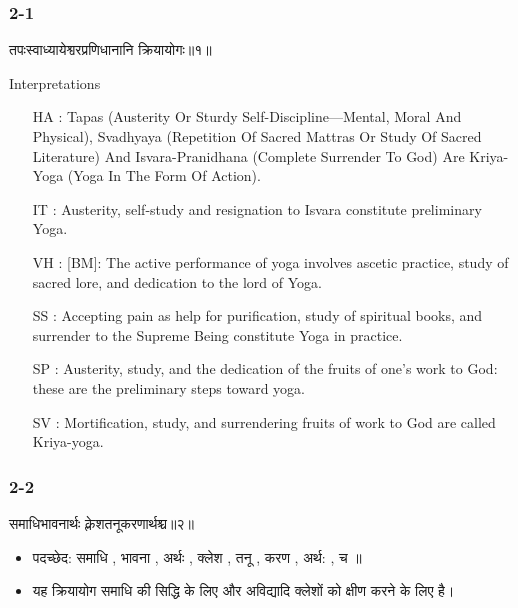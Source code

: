 \begin{frame}[fragile]\frametitle{2-1}
\begin{sanskrit}
तपःस्वाध्यायेश्वरप्रणिधानानि क्रियायोगः॥१॥
\end{sanskrit}

Interpretations
\begin{itemize}
\item [HA]: Tapas (Austerity Or Sturdy Self-Discipline—Mental, Moral And Physical), Svadhyaya (Repetition Of Sacred Mattras Or Study Of Sacred Literature) And Isvara-Pranidhana (Complete Surrender To God) Are Kriya-Yoga (Yoga In The Form Of Action).
\item [IT]: Austerity, self-study and resignation to Isvara constitute preliminary Yoga.
\item [VH]: [BM]: The active performance of yoga involves ascetic practice, study of sacred lore, and dedication to the lord of Yoga.
\item [SS]: Accepting pain as help for purification, study of spiritual books, and surrender to the Supreme Being constitute Yoga in practice.
\item [SP]: Austerity, study, and the dedication of the fruits of one’s work to God: these are the preliminary steps toward yoga.
\item [SV]: Mortification, study, and surrendering fruits of work to God are called Kriya-yoga. 
\end{itemize}
	
\end{frame}

\begin{frame}[fragile]\frametitle{2-2}
\begin{sanskrit}
समाधिभावनार्थः क्लेशतनूकरणार्थश्च॥२॥
\end{sanskrit}

\begin{itemize}
\item पदच्छेद: समाधि , भावना , अर्थः , क्लेश , तनू , करण , अर्थ: , च ॥
\item यह क्रियायोग समाधि की सिद्धि के लिए और अविद्यादि क्लेशों को क्षीण करने के लिए है।
\end{itemize}
	
\end{frame}

